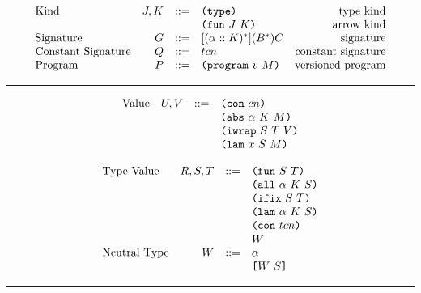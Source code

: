\documentclass[../plutus-core-specification.tex]{subfiles}
\begin{document}
\begin{minipage}{\linewidth}
\[\begin{array}{lrclr}
        \textrm{Kind}             & J,K    & ::= & \texttt{(} \texttt{type} \texttt{)}{}                   & \textrm{type kind}\\
                                  &        &     & \texttt{(} \texttt{fun} ~ J ~ K \texttt{)}                & \textrm{arrow kind}\\
        \textrm{Signature}        & G      & ::= & [(\alpha :: K)^*](B^*)C     & \textrm{signature}\\
        \textrm{Constant Signature}   & Q      & ::= & tcn                    & \textrm{constant signature}\\
        \textrm{Program}          & P      & ::= & \texttt{(} \texttt{program} ~ v ~ M \texttt{)}             & \textrm{versioned program}\\

    \end{array}\]
    \label{fig:grammar_algorithmic_restricted}
\end{minipage}

\medskip\hrule\medskip

\begin{minipage}{\linewidth}
    \centering
    \[\begin{array}{lrcl}
        \textrm{Value}            & U, V   & ::= & \texttt{(} \texttt{con} ~ cn \texttt{)}           \\
                                  &        &     & \texttt{(} \texttt{abs} ~ \alpha ~ K ~ M \texttt{)} \\
                                  &        &     & \texttt{(} \texttt{iwrap} ~ S ~ T ~ V \texttt{)}     \\
                                  &        &     & \texttt{(} \texttt{lam} ~ x ~ S ~ M \texttt{)}
    \end{array}\]
    \label{fig:grammar_algorithmic_restricted:values}
\end{minipage}

\begin{minipage}{\linewidth}
    \centering
    \[\begin{array}{lrcl}
        \textrm{Type Value}       & R,S,T  & ::= & \texttt{(} \texttt{fun} ~ S ~ T \texttt{)}         \\
                                  &        &     & \texttt{(} \texttt{all} ~ \alpha ~ K ~ S \texttt{)} \\
                                  &        &     & \texttt{(} \texttt{ifix} ~ S ~ T \texttt{)}         \\
                                  &        &     & \texttt{(} \texttt{lam} ~ \alpha ~ K ~ S \texttt{)} \\
                                  &        &     & \texttt{(} \texttt{con} ~ tcn \texttt{)}          \\
                                  &        &     & W                   \\
        \textrm{Neutral Type}     & W      & ::= & \alpha              \\
                                  &        &     & \texttt{[} W ~ S \texttt{]}
    \end{array}\]
    \label{fig:grammar_algorithmic_restricted:type-values}
\end{minipage}

\medskip\hrule\bigskip
\end{document}
